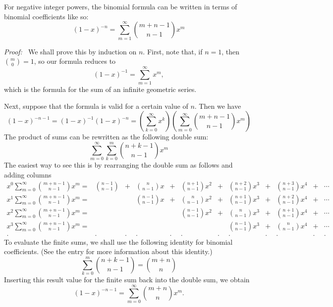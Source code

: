 \documentclass[12pt]{article}
\begin{document}
For negative integer powers, the binomial formula can be written in terms of binomial coefficients like so:
 $$(1 - x)^{-n} = \sum_{m = 1}^\infty \binom{m+n-1}{n-1} x^m$$

{\it Proof: \,}  We shall prove this by induction on $n$.  First, note that, if $n=1$, then $\binom{m}{0} = 1$, so our formula reduces to
 $$(1 - x)^{-1} = \sum_{m = 1}^\infty x^m ,$$
which is the formula for the sum of an infinite geometric series.

Next, suppose that the formula is valid for a certain value of $n$.  Then we have
 $$(1 - x)^{-n-1} = (1 - x)^{-1} (1 - x)^{-n} = \left( \sum_{k = 0}^\infty x^k \right) \left( \sum_{m = 0}^\infty {m+n-1 \choose n-1} x^m \right)$$
The product of sums can be rewritten as the following double sum:
 $$\sum_{m = 0}^\infty \sum_{k = 0}^m {n+k-1 \choose n-1} x^m$$
The easiest way to see this is by rearranging the double sum as follows and adding columns
 $$\begin{matrix}
x^0 \sum_{m = 0}^\infty \binom{m+n-1}{n-1} x^m = & \binom{n-1}{n-1} & + & \binom{n}{n-1} x & + & \binom{n+1}{n-1} x^2 & + & \binom{n+2}{n-1} x^3 & + & \binom{n+3}{n-1} x^4 & + & \cdots \\
x^1 \sum_{m = 0}^\infty \binom{m+n-1}{n-1} x^m = & & & \binom{n-1}{n-1} x & + & \binom{n}{n-1} x^2 & + & \binom{n+1}{n-1} x^3 & + & \binom{n+2}{n-1} x^4 & + & \cdots \\
x^2 \sum_{m = 0}^\infty \binom{m+n-1}{n-1} x^m = & & & & & \binom{n-1}{n-1} x^2 & + & \binom{n}{n-1} x^3 & + & \binom{n+1}{n-1} x^4 & + & \cdots \\
x^3 \sum_{m = 0}^\infty \binom{m+n-1}{n-1} x^m = & & & & & & & \binom{n-1}{n-1} x^3 & + & \binom{n}{n-1} x^4 & + & \cdots \\
. & . & . & . & . & . & . & . & . & . & . & .
\end{matrix}$$
To evaluate the finite sums, we shall use the following identity for binomial coefficients.  (See the entry  for more information about this identity.)
 $$\sum_{k = 0}^m \binom{n+k-1}{n-1} = \binom{m + n}{n}$$
Inserting this result value for the finite sum back into the double sum, we obtain
 $$(1 - x)^{-n-1} = \sum_{m = 0}^\infty \binom{m + n}{n} x^m.$$
\end{document}
